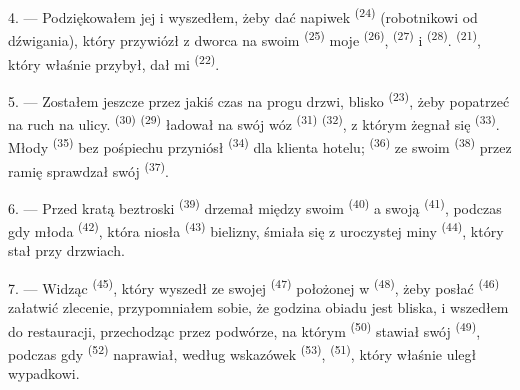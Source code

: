 4. --- Podziękowałem jej i wyszedłem, żeby dać napiwek 
\textsuperscript{(24)} (robotnikowi od dźwigania), który przywiózł z dworca na swoim
 \textsuperscript{(25)} moje 
\textsuperscript{(26)},  \textsuperscript{(27)} i  \textsuperscript{(28)}.  \textsuperscript{(21)},
który właśnie przybył, dał mi  \textsuperscript{(22)}.

5. --- Zostałem jeszcze przez jakiś czas na progu drzwi, blisko  \textsuperscript{(23)}, żeby popatrzeć na ruch na ulicy. 
\textsuperscript{(30)}  \textsuperscript{(29)} ładował na swój wóz
 \textsuperscript{(31)}  \textsuperscript{(32)}, z
którym żegnał się  \textsuperscript{(33)}. Młody
 \textsuperscript{(35)} bez pośpiechu przyniósł
 \textsuperscript{(34)} dla klienta hotelu; 
\textsuperscript{(36)} ze swoim  \textsuperscript{(38)}
przez ramię sprawdzał swój  \textsuperscript{(37)}.

\VUsaut{4.0mm}
\VUsaut{3.0mm}

6. --- Przed kratą beztroski  \textsuperscript{(39)} drzemał między
swoim  \textsuperscript{(40)} a swoją  \textsuperscript{(41)}, podczas gdy młoda 
\textsuperscript{(42)}, która niosła  \textsuperscript{(43)} bielizny,
śmiała się z uroczystej miny  \textsuperscript{(44)}, który stał
przy drzwiach.

7. --- Widząc  \textsuperscript{(45)}, który wyszedł ze swojej
 \textsuperscript{(47)} położonej w 
\textsuperscript{(48)}, żeby posłać  \textsuperscript{(46)} załatwić
zlecenie, przypomniałem sobie, że godzina obiadu jest bliska, i wszedłem do
restauracji, przechodząc przez podwórze, na którym 
\textsuperscript{(50)} stawiał swój  \textsuperscript{(49)}, podczas
gdy  \textsuperscript{(52)} naprawiał, według wskazówek
 \textsuperscript{(53)}, 
\textsuperscript{(51)}, który właśnie uległ wypadkowi.

